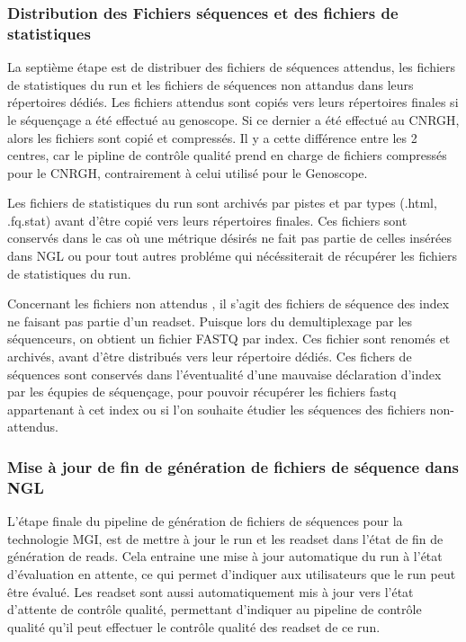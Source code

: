 \subsubsection{Distribution des Fichiers séquences et des fichiers de statistiques}
La septième étape est de distribuer des fichiers de séquences \og attendus\fg{}, les fichiers de statistiques du run et les fichiers de séquences \og non attandus\fg{} dans leurs répertoires dédiés.
Les fichiers attendus sont copiés vers leurs répertoires finales si le séquençage a été effectué au genoscope.
Si ce dernier a été effectué au CNRGH, alors les fichiers sont copié et compressés.
Il y a cette différence entre les 2 centres, car le pipline de contrôle qualité prend en charge de fichiers compressés pour le CNRGH, contrairement à celui utilisé pour le Genoscope.

Les fichiers de statistiques du run sont archivés par pistes et par types (.html, .fq.stat) avant d'être copié vers leurs répertoires finales.
Ces fichiers sont conservés dans le cas où une métrique désirés ne fait pas partie de celles insérées dans NGL ou pour tout autres probléme qui nécéssiterait de récupérer les fichiers de statistiques du run.

Concernant les fichiers \og non attendus \fg{}, il s'agit des fichiers de séquence des index ne faisant pas partie d'un readset. Puisque lors du demultiplexage par les séquenceurs, on obtient un fichier FASTQ par index.
Ces fichier sont renomés et archivés, avant d'être distribués vers leur répertoire dédiés.
Ces fichers de séquences sont conservés dans l'éventualité d'une mauvaise déclaration d'index par les équpies de séquençage, pour pouvoir récupérer les fichiers fastq appartenant à cet index ou si l'on souhaite étudier les séquences des fichiers \og non-attendus\fg{}.\\

\subsubsection{Mise à jour de fin de génération de fichiers de séquence dans NGL}
L'étape finale du pipeline de génération de fichiers de séquences pour la technologie MGI, est de mettre à jour le run et les readset dans l'état de \og fin de génération de reads\fg{}.
Cela entraine une mise à jour automatique du run à l'état \og d'évaluation en attente\fg{}, ce qui permet d'indiquer aux utilisateurs que le run peut être évalué.
Les readset sont aussi automatiquement mis à jour vers l'état \og d'attente de contrôle qualité\fg{}, permettant d'indiquer au pipeline de contrôle qualité qu'il peut effectuer le contrôle qualité des readset de ce run.

